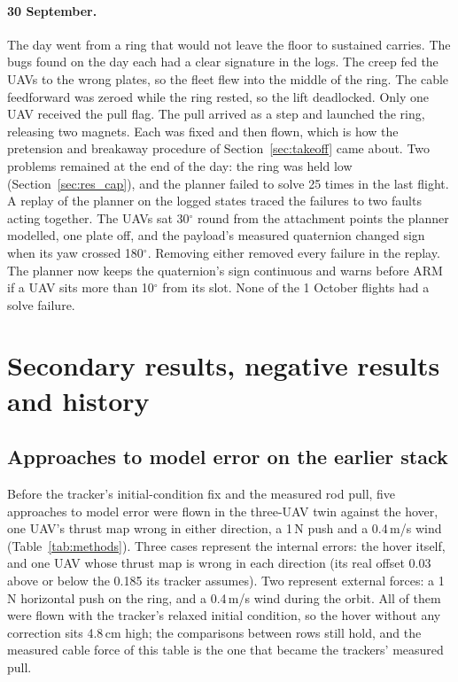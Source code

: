 \paragraph{30 September.} The day went from a ring that would not leave the floor to sustained
carries. The bugs found on the day each had a clear signature in the logs. The creep fed the UAVs to the
wrong plates, so the fleet flew into the middle of the ring. The cable feedforward was zeroed while the
ring rested, so the lift deadlocked. Only one UAV received the pull flag. The pull arrived as a step
and launched the ring, releasing two magnets. Each was fixed and then flown, which is how the
pretension and breakaway procedure of Section~\ref{sec:takeoff} came about. Two problems remained at
the end of the day: the ring was held low (Section~\ref{sec:res_cap}), and the planner failed to solve 25 times in the last
flight.
A replay of the planner on the logged states traced the failures to two faults acting
together. The UAVs sat 30$^\circ$ round from the attachment points the planner modelled, one plate off,
and the payload's measured quaternion changed sign when its yaw crossed 180$^\circ$. Removing either
removed every failure in the replay. The planner now keeps the quaternion's sign continuous and
warns before ARM if a UAV sits more than 10$^\circ$ from its slot. None of the 1 October flights had a
solve failure.



\section{Secondary results, negative results and history}
\label{sec:app_negatives}

\subsection{Approaches to model error on the earlier stack}
\label{sec:app_methods}

Before the tracker's initial-condition fix and the measured rod pull, five approaches to model error were flown in
the three-UAV twin against the hover, one UAV's thrust map wrong in either direction, a 1\,N push and a 0.4\,m/s wind
(Table~\ref{tab:methods}). Three cases represent the internal errors: the hover itself, and one UAV whose thrust map
is wrong in each direction (its real offset 0.03 above or below the 0.185 its tracker assumes). Two represent external
forces: a 1\,N horizontal push on the ring, and a 0.4\,m/s wind during the orbit. All of them were flown with the
tracker's relaxed initial condition, so the hover without any correction sits 4.8\,cm high; the comparisons between
rows still hold, and the measured cable force of this table is the one that became the trackers' measured pull.

